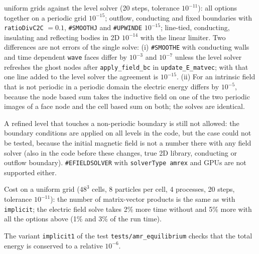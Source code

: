 \documentclass[a4paper,11pt]{article}
\newcommand{\code}[1]{\texttt{#1}}
\begin{document}
uniform grids against the level solver (20 steps, tolerance $10^{-11}$): all options
together on a periodic grid $10^{-15}$; outflow, conducting and fixed boundaries with
\code{ratioDivC2C} $=0.1$, \code{\#SMOOTHJ} and \code{\#UPWINDE} $10^{-15}$; line-tied,
conducting, insulating and reflecting bodies in 2D $10^{-14}$ with the linear limiter.
Two differences are not errors of the single solve: (i) \code{\#SMOOTHE} with
conducting walls and time dependent \code{wave} faces differ by $10^{-3}$ and
$10^{-7}$ unless the level solver refreshes the ghost nodes after
\code{apply\_field\_bc} in \code{update\_E\_matvec}; with that one line added to the
level solver the agreement is $10^{-15}$. (ii) For an intrinsic field that is not
periodic in a periodic domain the electric energy differs by $10^{-5}$, because the
node based sum takes the inductive field on one of the two periodic images of a face
node and the cell based sum on both; the solves are identical.

A refined level that touches a non-periodic boundary is still not allowed: the
boundary conditions are applied on all levels in the code, but the case could not be
tested, because the initial magnetic field is not a number there with any field
solver (also in the code before these changes, true 2D library, conducting or outflow
boundary). \code{\#EFIELDSOLVER} with \code{solverType amrex} and GPUs are not
supported either.

Cost on a uniform grid ($48^3$ cells, 8 particles per cell, 4 processes, 20 steps,
tolerance $10^{-11}$): the number of matrix-vector products is the same as with
\code{implicit}; the electric field solve takes 2\% more time without and 5\% more
with all the options above (1\% and 3\% of the run time).

The variant \code{implicit1} of the test \code{tests/amr\_equilibrium} checks that the
total energy is conserved to a relative $10^{-6}$.

\end{document}
